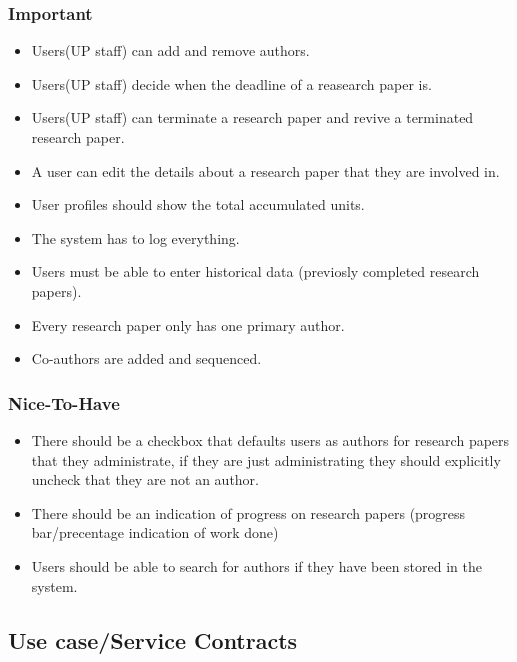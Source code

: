 \documentclass[a4paper,12pt]{report}
\begin{document}
\subsubsection{Important}
	\begin{itemize}
		\item Users(UP staff) can add and remove authors.
		\item Users(UP staff) decide when the deadline of a reasearch paper is.
		\item Users(UP staff) can terminate a research paper and revive a terminated research paper.
		\item A user can edit the details about a research paper that they are involved in.
		\item User profiles should show the total accumulated units.
		\item The system has to log everything.
		\item Users must be able to enter historical data (previosly completed research papers).
		\item Every research paper only has one primary author.
		\item Co-authors are added and sequenced.
	\end{itemize}

\subsubsection{Nice-To-Have}
	\begin{itemize}
		\item There should be a checkbox that defaults users as authors for research papers that they administrate, if they are just administrating they should explicitly uncheck that they are not an author.
		\item There should be an indication of progress on research papers (progress bar/precentage indication of work done)
		\item Users should be able to search for authors if they have been stored in the system.
	\end{itemize}

\subsection{Use case/Service Contracts}
\end{document}
